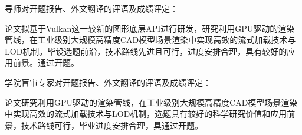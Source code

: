 \cleardoublepage{}
{
    \bfseries

    {
        \noindent 导师对开题报告、外文翻译的评语及成绩评定：
        
        \mdseries
        论文拟基于Vulkan这一较新的图形底层API进行研发，研究利用GPU驱动的渲染管线，在工业级别大规模高精度CAD模型场景渲染中实现高效的流式加载技术与LOD机制。毕设选题前沿，技术路线先进且可行，进度安排合理，具有较好的应用前景。通过开题。
    }

    \bfseries
    \designproposaleval[15][5]
    \signature{导师签名}

    {
        \noindent 学院盲审专家对开题报告、外文翻译的评语及成绩评定：

        \mdseries
        论文研究利用GPU驱动的渲染管线，在工业级别大规模高精度CAD模型场景渲染中实现高效的流式加载技术与LOD机制，选题具有较好的科学研究价值和应用前景，技术路线可行，毕业进度安排合理，具通过开题。
    }


    \mbox{} \vfill
    \designproposaleval
    \signature{开题报告审核负责人（签名/签章）}
}
